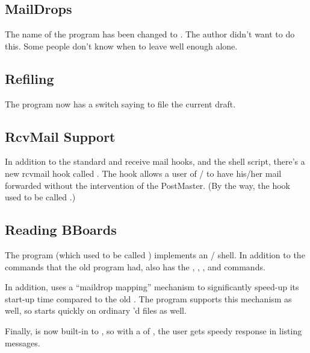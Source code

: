 \subsection{MailDrops}
The name of the  program has been changed to .
The author didn't want to do this.
Some people don't know when to leave well enough alone.

\subsection{Refiling}
The  program now has a  switch saying to file the
current draft.

\subsection{RcvMail Support}
In addition to the standard  and  receive mail hooks,
and the  shell script,
there's a new rcvmail hook called .
The  hook allows a user of \MH/ to have his/her mail forwarded
without the intervention of the PostMaster.
(By the way, the  hook used to be called .)

\subsection{Reading BBoards}
The  program (which used to be called )
implements an \MH/ shell.
In addition to the commands that the old  program had,
 also has the
, , ,  and  commands.

In addition,  uses a ``maildrop mapping'' mechanism to
significantly speed-up its start-up time compared to the old .
The  program supports this mechanism as well,
so  starts quickly on ordinary 'd files as well.

Finally,  is now built-in to ,
so with a  of ,
the  user gets speedy response in listing messages.
